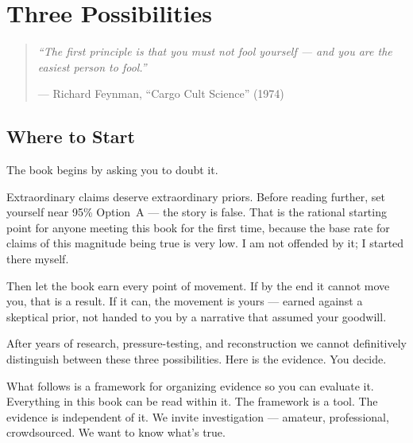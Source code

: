 

\chapter{Three Possibilities}
\label{spine:three-possibilities}

\begin{quote}\small\textit{%
``The first principle is that you must not fool yourself --- and you are the easiest person to fool.''%
}\par\raggedleft --- Richard Feynman, ``Cargo Cult Science'' (1974)\end{quote}

\vspace{0.5cm}

\section*{Where to Start}
\label{spine:where-to-start}

The book begins by asking you to doubt it.

Extraordinary claims deserve extraordinary priors. Before reading further, set yourself near 95\% Option~A --- the story is false. That is the rational starting point for anyone meeting this book for the first time, because the base rate for claims of this magnitude being true is very low. I am not offended by it; I started there myself.

Then let the book earn every point of movement. If by the end it cannot move you, that is a result. If it can, the movement is yours --- earned against a skeptical prior, not handed to you by a narrative that assumed your goodwill.

\vspace{0.5cm}

After years of research, pressure-testing, and reconstruction we cannot definitively distinguish between these three possibilities. Here is the evidence. You decide.

What follows is a framework for organizing evidence so you can evaluate it. Everything in this book can be read within it. The framework is a tool. The evidence is independent of it. We invite investigation --- amateur, professional, crowdsourced. We want to know what's true.

